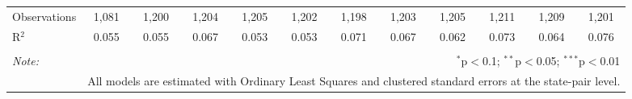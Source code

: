 \begin{table}[!htbp]
\begin{tabular}{@{\extracolsep{5pt}}lccccccccccc}
Observations & 1,081 & 1,200 & 1,204 & 1,205 & 1,202 & 1,198 & 1,203 & 1,205 & 1,211 & 1,209 & 1,201 \\ 
R$^{2}$ & 0.055 & 0.055 & 0.067 & 0.053 & 0.053 & 0.071 & 0.067 & 0.062 & 0.073 & 0.064 & 0.076 \\ 
\hline 
\hline \\[-1.8ex] 
\textit{Note:}  & \multicolumn{11}{r}{$^{*}$p$<$0.1; $^{**}$p$<$0.05; $^{***}$p$<$0.01} \\ 
 & \multicolumn{11}{r}{All models are estimated with Ordinary Least Squares and clustered standard errors at the state-pair level.} \\ 
\end{tabular} 
\end{table} 
